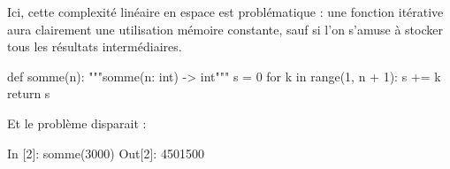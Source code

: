\documentclass{magnolia}
\begin{document}
Ici, cette complexité linéaire en espace est problématique : une fonction itérative
aura clairement une utilisation mémoire constante, sauf si l'on s'amuse à stocker tous les
résultats intermédiaires.

\begin{pythoncodeline}
def somme(n):
    """somme(n: int) -> int"""
    s = 0
    for k in range(1, n + 1):
        s += k
    return s
\end{pythoncodeline}

\noindent Et le problème disparait :
\begin{camlcode}
In [2]: somme(3000)
Out[2]: 4501500 
\end{camlcode}




\end{document}

